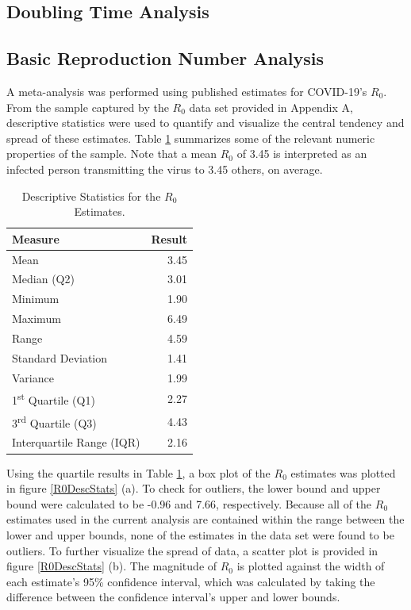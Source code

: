 \documentclass{article}
\begin{document}
\subsection{Doubling Time Analysis}


\subsection{Basic Reproduction Number Analysis}
A meta-analysis was performed using published estimates for COVID-19's $R_0$. From the sample captured by the $R_0$ data set provided in Appendix A, descriptive statistics were used to quantify and visualize the central tendency and spread of these estimates. Table \ref{tab:table1} summarizes some of the relevant numeric properties of the sample. Note that a mean $R_0$ of 3.45 is interpreted as an infected person transmitting the virus to 3.45 others, on average.

\begin{table}[htp]
  \begin{center}
    \caption{Descriptive Statistics for the $R_0$ Estimates.}
    \label{tab:table1}
    \begin{tabular}{l|r}
    \hline \hline
      \textbf{Measure} & \textbf{Result} \\
      \hline
      Mean & 3.45\\
      Median (Q2) & 3.01\\
      Minimum & 1.90\\
      Maximum & 6.49\\
      Range & 4.59\\
      Standard Deviation & 1.41\\
      Variance & 1.99\\
      1\textsuperscript{st} Quartile (Q1) & 2.27\\
      3\textsuperscript{rd} Quartile (Q3) & 4.43\\
      Interquartile Range (IQR) & 2.16\\
      \hline \hline
    \end{tabular}
  \end{center}
\end{table}

Using the quartile results in Table \ref{tab:table1}, a box plot of the $R_0$ estimates was plotted in figure \ref{R0DescStats} (a). To check for outliers, the lower bound and upper bound were calculated to be -0.96 and 7.66, respectively. Because all of the $R_0$ estimates used in the current analysis are contained within the range between the lower and upper bounds, none of the estimates in the data set were found to be outliers. To further visualize the spread of data, a scatter plot is provided in figure \ref{R0DescStats} (b). The magnitude of $R_0$ is plotted against the width of each estimate's 95\% confidence interval, which was calculated by taking the difference between the confidence interval's upper and lower bounds.
\end{document}
